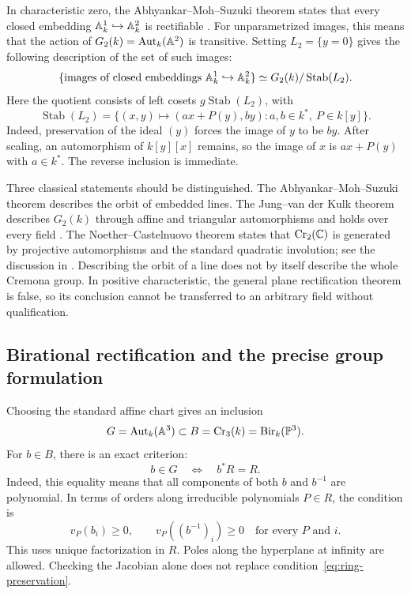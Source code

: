 In characteristic zero, the Abhyankar--Moh--Suzuki theorem states
that every closed embedding ${\mathbb A}^1_k\hookrightarrow{\mathbb A}^2_k$ is
rectifiable \cite{AM1975,Suzuki1974}. For unparametrized images,
this means that the action of $G_2(k)=\operatorname{Aut}_k({\mathbb A}^2)$ is transitive.
Setting $L_2=\{y=0\}$ gives the following description of the set
of such images:
\[
 \{\text{images of closed embeddings }{\mathbb A}^1_k\hookrightarrow{\mathbb A}^2_k\}
 \simeq G_2(k)/\operatorname{Stab}(L_2).
\]
Here the quotient consists of left cosets
$g\operatorname{Stab}(L_2)$, with
\begin{equation}\label{eq:plane-stabilizer}
 \operatorname{Stab}(L_2)=
 \{(x,y)\mapsto(ax+P(y),by):a,b\in k^*,\ P\in k[y]\}.
\end{equation}
Indeed, preservation of the ideal $(y)$ forces the image of $y$
to be $by$. After scaling, an automorphism of $k[y][x]$ remains,
so the image of $x$ is $ax+P(y)$ with $a\in k^*$. The reverse
inclusion is immediate.

Three classical statements should be distinguished.
The Abhyankar--Moh--Suzuki theorem describes the orbit of embedded
lines. The Jung--van der Kulk theorem describes $G_2(k)$ through
affine and triangular automorphisms and holds over every field
\cite[Theorem~1]{EV2001}. The Noether--Castelnuovo theorem states
that $\operatorname{Cr}_2({\mathbb C})$ is generated by projective automorphisms and the
standard quadratic involution; see the discussion in
\cite[\S1]{BH2015}. Describing the orbit of a line does not by
itself describe the whole Cremona group. In positive
characteristic, the general plane rectification theorem is false,
so its conclusion cannot be transferred to an arbitrary field
without qualification.

\subsection{Birational rectification and the precise group formulation}

Choosing the standard affine chart gives an inclusion
\[
 G=\operatorname{Aut}_k({\mathbb A}^3)\subset B=\operatorname{Cr}_3(k)=\operatorname{Bir}_k(\mathbb P^3).
\]
For $b\in B$, there is an exact criterion:
\begin{equation}\label{eq:ring-preservation}
 b\in G\quad\Longleftrightarrow\quad b^*R=R.
\end{equation}
Indeed, this equality means that all components of both $b$ and
$b^{-1}$ are polynomial. In terms of orders along irreducible
polynomials $P\in R$, the condition is
\[
 v_P(b_i)\geq0,\qquad v_P((b^{-1})_i)\geq0
 \quad\text{for every }P\text{ and }i.
\]
This uses unique factorization in $R$. Poles along the hyperplane
at infinity are allowed. Checking the Jacobian alone does not
replace condition~\eqref{eq:ring-preservation}.

